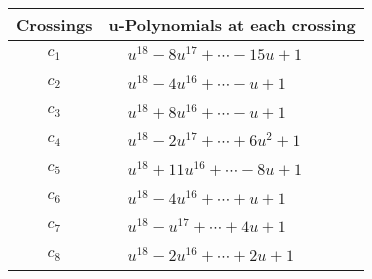 \documentclass[1p]{elsarticle_modified}
\theoremstyle{definition}
\begin{document}
\begin{tabular}{m{50pt}|m{274pt}}
Crossings & \hspace{64pt}u-Polynomials at each crossing \\
\hline $$\begin{aligned}c_{1}\end{aligned}$$&$\begin{aligned}
&u^{18}-8 u^{17}+\cdots-15 u+1
\end{aligned}$\\
\hline $$\begin{aligned}c_{2}\end{aligned}$$&$\begin{aligned}
&u^{18}-4 u^{16}+\cdots- u+1
\end{aligned}$\\
\hline $$\begin{aligned}c_{3}\end{aligned}$$&$\begin{aligned}
&u^{18}+8 u^{16}+\cdots- u+1
\end{aligned}$\\
\hline $$\begin{aligned}c_{4}\end{aligned}$$&$\begin{aligned}
&u^{18}-2 u^{17}+\cdots+6 u^2+1
\end{aligned}$\\
\hline $$\begin{aligned}c_{5}\end{aligned}$$&$\begin{aligned}
&u^{18}+11 u^{16}+\cdots-8 u+1
\end{aligned}$\\
\hline $$\begin{aligned}c_{6}\end{aligned}$$&$\begin{aligned}
&u^{18}-4 u^{16}+\cdots+u+1
\end{aligned}$\\
\hline $$\begin{aligned}c_{7}\end{aligned}$$&$\begin{aligned}
&u^{18}- u^{17}+\cdots+4 u+1
\end{aligned}$\\
\hline $$\begin{aligned}c_{8}\end{aligned}$$&$\begin{aligned}
&u^{18}-2 u^{16}+\cdots+2 u+1
\end{aligned}$\\

\end{tabular}
\end{document}
